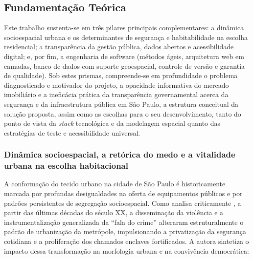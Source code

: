 \documentclass[
    12pt,
    oneside,            %
    a4paper,
    brazilian
    ]{abntex2}
\begin{document}
\subsection{Fundamentação Teórica}
Este trabalho sustenta-se em três pilares principais complementares: a dinâmica socioespacial urbana e os determinantes de segurança e habitabilidade na escolha residencial; a transparência da gestão pública, dados abertos e acessibilidade digital; e, por fim, a engenharia de software (métodos ágeis, arquitetura web em camadas, banco de dados com suporte geoespacial, controle de versão e garantia de qualidade). Sob estes prismas, compreende-se em profundidade o problema diagnosticado e motivador do projeto, a opacidade informativa do mercado imobiliário e a ineficácia prática da transparência governamental acerca da segurança e da infraestrutura pública em São Paulo, a estrutura conceitual da solução proposta, assim como as escolhas para o seu desenvolvimento, tanto do ponto de vista da \emph{stack} tecnológica e da modelagem espacial quanto das estratégias de teste e acessibilidade universal.

\subsubsection{Dinâmica socioespacial, a retórica do medo e a vitalidade urbana na escolha habitacional}
A conformação do tecido urbano na cidade de São Paulo é historicamente marcada por profundas desigualdades na oferta de equipamentos públicos e por padrões persistentes de segregação socioespacial. Como analisa criticamente , a partir das últimas décadas do século XX, a disseminação da violência e a instrumentalização generalizada da ``fala do crime'' alteraram estruturalmente o padrão de urbanização da metrópole, impulsionando a privatização da segurança cotidiana e a proliferação dos chamados enclaves fortificados. A autora sintetiza o impacto dessa transformação na morfologia urbana e na convivência democrática:
\end{document}
